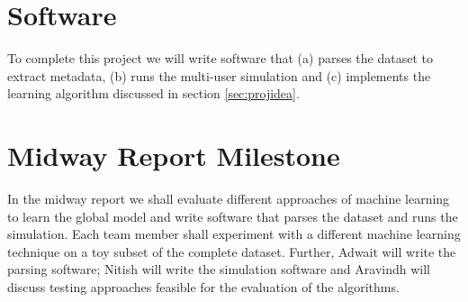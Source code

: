 \documentclass{article} %
\begin{document}
\section{Software}
\vspace{-0.125in}
To complete this project we will write software that (a) parses the dataset to extract metadata, (b) runs the multi-user simulation and (c) implements the learning algorithm discussed in section \ref{sec:projidea}.
\vspace{-0.125in}
\section{Midway Report Milestone}
\vspace{-0.125in}
In the midway report we shall evaluate different approaches of machine learning to learn the global model and write software that parses the dataset and runs the simulation. Each team member shall experiment with a different machine learning technique on a toy subset of the complete dataset. Further, Adwait will write the parsing software; Nitish will write the simulation software and Aravindh will discuss testing approaches feasible for the evaluation of the algorithms.

\nocite{personalizingimagesearchresults}
\nocite{lornet}
\nocite{Sebastiani:2002:MLA:505282.505283}




\end{document}
